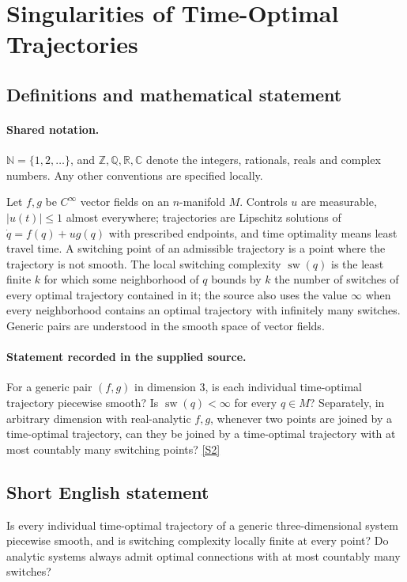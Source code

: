 \documentclass[11pt]{article}
\newcommand{\sref}[2]{\hyperlink{source:#1:#2}{[S#2]}}
\begin{document}
\section{Singularities of Time-Optimal Trajectories}\label{statement}

\subsection{Definitions and mathematical statement}

\paragraph{Shared notation.}$\mathbb N=\{1,2,\ldots\}$, and $\mathbb Z,\mathbb Q,\mathbb R,\mathbb C$ denote the integers, rationals, reals and complex numbers. Any other conventions are specified locally.


Let $f,g$ be $C^\infty$ vector fields on an $n$-manifold $M$. Controls $u$ are measurable, $|u(t)|\leq1$ almost everywhere; trajectories are Lipschitz solutions of $\dot q=f(q)+ug(q)$ with prescribed endpoints, and time optimality means least travel time. A switching point of an admissible trajectory is a point where the trajectory is not smooth. The local switching complexity $\operatorname{sw}(q)$ is the least finite $k$ for which some neighborhood of $q$ bounds by $k$ the number of switches of every optimal trajectory contained in it; the source also uses the value $\infty$ when every neighborhood contains an optimal trajectory with infinitely many switches. Generic pairs are understood in the smooth space of vector fields.
\paragraph{Statement recorded in the supplied source.}
For a generic pair $(f,g)$ in dimension $3$, is each individual time-optimal trajectory piecewise smooth? Is $\operatorname{sw}(q)<\infty$ for every $q\in M$? Separately, in arbitrary dimension with real-analytic $f,g$, whenever two points are joined by a time-optimal trajectory, can they be joined by a time-optimal trajectory with at most countably many switching points? \sref{statement}{2}
\subsection{Short English statement}
Is every individual time-optimal trajectory of a generic three-dimensional system piecewise smooth, and is switching complexity locally finite at every point? Do analytic systems always admit optimal connections with at most countably many switches?
\end{document}
